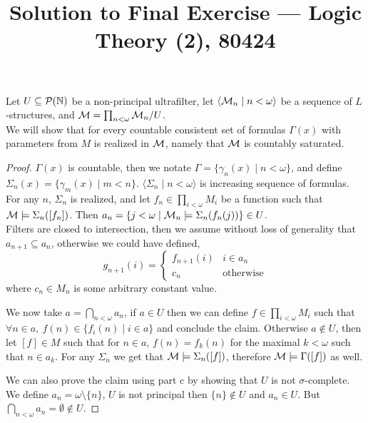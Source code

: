 
\title{Solution to Final Exercise --- Logic Theory (2), 80424}

\DeclareMathOperator{\PA}{PA}
\DeclareMathOperator{\Coll}{Coll}
\DeclareMathOperator{\Ind}{Ind}
\DeclareMathOperator{\Sat}{Sat}
\DeclareMathOperator{\pr}{Pr}
\DeclareMathOperator{\sent}{sent}
\DeclareMathOperator{\form}{form}
\DeclareMathOperator{\val}{Val}
\DeclareMathOperator{\sat}{Sat}
\DeclareMathOperator{\term}{term}
\DeclareMathOperator{\sk}{Sk}
\DeclareMathOperator{\FV}{FV}


\maketitle
\maketitleprint[yellow]

\question{}
\subquestion{}
Let $U \subseteq \mathcal{P}(\mathbb{N})$ be a non-principal ultrafilter, let $\langle \mathcal{M}_n \mid n < \omega \rangle$ be a sequence of $L$-structures, and $\mathcal{M} = \prod_{n < \omega} \mathcal{M}_n / U$. \\
We will show that for every countable consistent set of formulas $\Gamma(x)$ with parameters from $M$ is realized in $\mathcal{M}$, namely that $\mathcal{M}$ is countably saturated.
\begin{proof}
	$\Gamma(x)$ is countable, then we notate $\Gamma = \{ \gamma_n(x) \mid n < \omega \}$, and define $\Sigma_n(x) = \{ \gamma_m(x) \mid m < n \}$.
	$\langle \Sigma_n \mid n < \omega \rangle$ is increasing sequence of formulas.
	For any $n$, $\Sigma_n$ is realized, and let $f_n \in \prod_{i < \omega} M_i$ be a function such that $\mathcal{M} \models \Sigma_n([f_n])$.
	Then $a_n = \{ j < \omega \mid \mathcal{M}_n \models \Sigma_n(f_n(j)) \} \in U$. \\
	Filters are closed to intersection, then we assume without loss of generality that $a_{n + 1} \subseteq a_n$, otherwise we could have defined,
	\[
		g_{n + 1}(i) = \begin{cases}
			f_{n + 1}(i) & i \in a_n \\
			c_n & \text{otherwise}
		\end{cases}
	\]
	where $c_n \in M_n$ is some arbitrary constant value.

	We now take $a = \bigcap_{n < \omega} a_n$, if $a \in U$ then we can define $f \in \prod_{i < \omega} M_i$ such that $\forall n \in a,\ f(n) \in \{ f_i(n) \mid i \in a \}$ and conclude the claim.
	Otherwise $a \notin U$, then let $[f] \in M$ such that for $n \in a$, $f(n) = f_k(n)$ for the maximal $k < \omega$ such that $n \in a_k$.
	For any $\Sigma_n$ we get that $\mathcal{M} \models \Sigma_n([f])$, therefore $\mathcal{M} \models \Gamma([f])$ as well.

	We can also prove the claim using part c by showing that $U$ is not $\sigma$-complete. \\
	We define $a_n = \omega \setminus \{ n \}$, $U$ is not principal then $\{ n \} \notin U$ and $a_n \in U$.
	But $\bigcap_{n < \omega} a_n = \emptyset \notin U$.
\end{proof}

